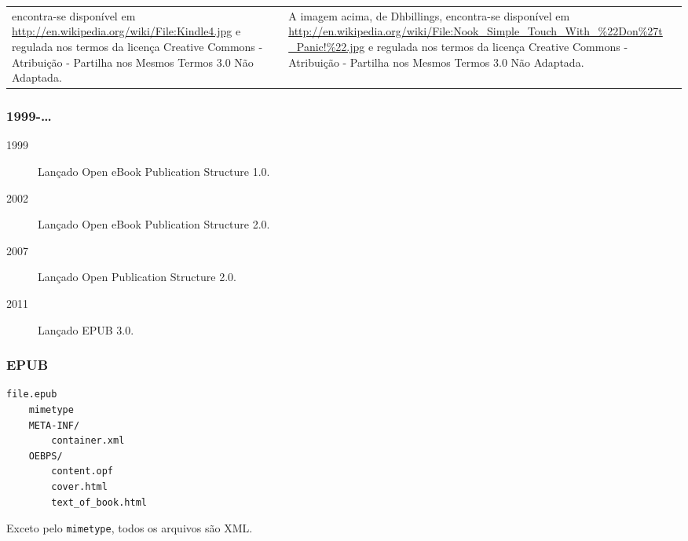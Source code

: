 \documentclass[]{beamer}
\begin{document}
\begin{frame}[fragile]
\begin{tiny}
\begin{center}
\begin{tabular}{p{}p{}p{}}
encontra-se dispon\'{i}vel em \url{http://en.wikipedia.org/wiki/File:Kindle4.jpg} e regulada nos termos da licen\c{c}a Creative Commons - Atribui\c{c}\~{a}o - Partilha nos Mesmos Termos 3.0 N\~{a}o Adaptada. & A imagem acima, de Dhbillings, encontra-se dispon\'{i}vel em \url{http://en.wikipedia.org/wiki/File:Nook_Simple_Touch_With_%22Don%27t_Panic!%22.jpg} e regulada nos termos da licen\c{c}a Creative Commons - Atribui\c{c}\~{a}o - Partilha nos Mesmos Termos 3.0 N\~{a}o Adaptada.
            \end{tabular}
        \end{center}
    \end{tiny}
\end{frame}

\begin{frame}
    \frametitle{1999-\dots}
    \begin{description}
        \item[1999] Lan\c{c}ado Open eBook Publication Structure 1.0.
        \item[2002] Lan\c{c}ado Open eBook Publication Structure 2.0.
        \item[2007] Lan\c{c}ado Open Publication Structure 2.0.
        \item[2011] Lan\c{c}ado EPUB 3.0.
    \end{description}
\end{frame}

\begin{frame}[fragile]
    \frametitle{EPUB}
    \begin{lstlisting}
file.epub
    mimetype
    META-INF/
        container.xml
    OEBPS/
        content.opf
        cover.html
        text_of_book.html
    \end{lstlisting}

    Exceto pelo \lstinline!mimetype!, todos os arquivos s\~{a}o XML.
\end{frame}
\end{document}
